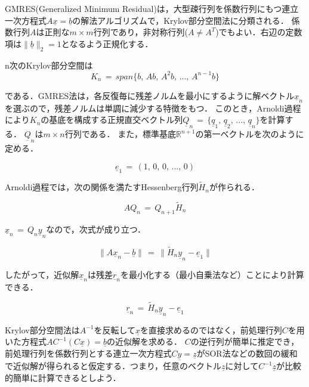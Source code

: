 GMRES(Generalized Minimum Residual)は，大型疎行列を係数行列にもつ連立一次方程式$A \underline{x} = \underline{b}$の解法アルゴリズムで，Krylov部分空間法に分類される．
係数行列$A$は正則な$m \times m$行列であり，非対称行列($A \neq A^T$)でもよい．右辺の定数項は$\|\underline{b}\|_2=1$となるよう正規化する．

n次のKrylov部分空間は
\begin{equation}
K_n \,=\, span \{ b,\, Ab,\, A^2b,\, ...,\, A^{n-1}b \}
\label{eq:subspace}
\end{equation}

\noindent である．GMRES法は，各反復毎に残差ノルムを最小にするように解ベクトル$\underline{x}_n$を選ぶので，残差ノルムは単調に減少する特徴をもつ．
このとき，Arnoldi過程により$K_n$の基底を構成する正規直交ベクトル列$\underline{Q}_n\,=\,\{\underline{q}_1,\,\underline{q}_2,\,...,\,\underline{q}_n\}$を計算する．
$\underline{Q}_n$は$m\times n$行列である．
また，標準基底$\mathbb{R}^{n+1}$の第一ベクトルを次のように定める．

\begin{equation}
\underline{e}_1 \,=\, (1,\,0,\,0,\,...,\,0)
\label{eq:1st basis}
\end{equation}

Arnoldi過程では，次の関係を満たすHessenberg行列$\tilde{H}_n$が作られる．

\begin{equation}
A Q_n \,=\, Q_{n+1} \tilde{H}_n
\label{eq:Hessenberg matrix}
\end{equation}

$\underline{x}_n\,=\,Q_n \underline{y}_n$なので，次式が成り立つ．

\begin{equation}
\| A \underline{x}_n - \underline{b} \| \,=\, \| \tilde{H}_n \underline{y}_n - \underline{e}_1 \|
\label{eq:Hessenberg norm}
\end{equation}

したがって，近似解$\underline{x}_n$は残差$\underline{r}_n$を最小化する（最小自乗法など）ことにより計算できる．

\begin{equation}
\underline{r}_n \,=\, \tilde{H}_n \underline{y}_n - \underline{e}_1 
\label{eq:Hessenberg redsidual}
\end{equation}

Krylov部分空間法は$A^{-1}$を反転して$\underline{x}$を直接求めるのではなく，前処理行列$C$を用いた方程式$A C^{-1} (C \underline{x}) = \underline{b}$の近似解を求める．
$C$の逆行列が簡単に推定でき，前処理行列を係数行列とする連立一次方程式$C \underline{y} = \underline{z}$がSOR法などの数回の緩和で近似解が得られると仮定する．つまり，任意のベクトル$\underline{z}$に対して$C^{-1}\underline{z}$が比較的簡単に計算できるとしよう．












